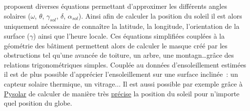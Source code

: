  proposent diverses équations permettant d’approximer
les différents angles solaires ($\omega$, $\theta$, $\gamma_{sol}$, $\delta$, $\alpha_{sol}$).
Ainsi afin de calculer la position du soleil il est alors uniquement nécessaire de connaître la latitude, la longitude,
l’orientation de la surface ($\gamma$) ainsi que l’heure locale. Ces équations simplifiées
couplées à la géométrie des bâtiment permettent alors de calculer le masque créé par les obstructions
tel qu’une avancée de toiture, un arbre, une montagn\dots grâce des relations trigonométriques simples.
Couplée au données d’ensoleillement estimées il est de plus possible d’apprécier l’ensoleillement
sur une surface inclinée~: un capteur solaire thermique, un vitrage...
Il est aussi possible par exemple grâce à \href{http://pysolar.org/}{Pysolar} de calculer
de manière très \href{http://docs.pysolar.org/en/latest/#validation}{précise} la
position du soleil pour n’importe quel position du globe.


